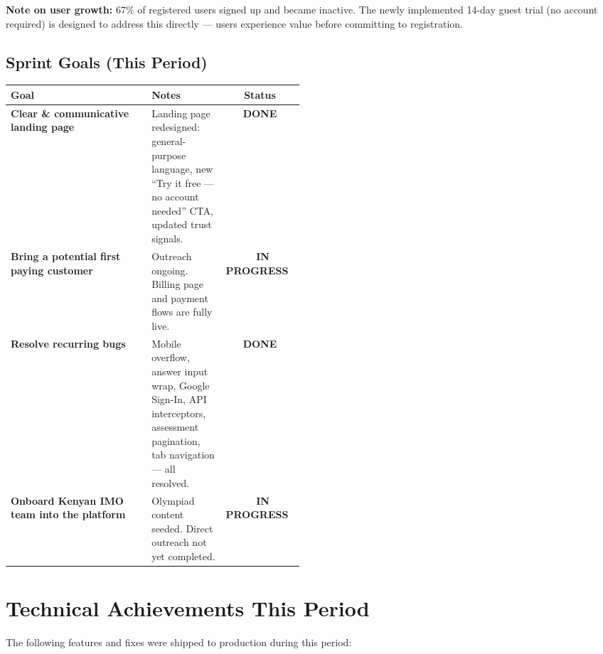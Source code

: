 \documentclass[12pt,a4paper]{article}
\newcommand{\badge}[2]{%
  \colorbox{#1}{\small\color{white}\textbf{\ #2\ }}%
}
\newcommand{\done}{\badge{emerald}{DONE}}
\newcommand{\inprog}{\badge{amber}{IN PROGRESS}}
\begin{document}
\vspace{6pt}
\textbf{Note on user growth:} 67\% of registered users signed up and became inactive.
The newly implemented 14-day guest trial (no account required) is designed to
address this directly — users experience value before committing to registration.

\subsection{Sprint Goals (This Period)}

\begin{tabularx}{\linewidth}{>{\bfseries}p{0.48\linewidth} X c}
\toprule
\textbf{Goal} & \textbf{Notes} & \textbf{Status} \\
\midrule
\rowcolor{rowgray}
Clear \& communicative landing page & Landing page redesigned: general-purpose
language, new ``Try it free — no account needed'' CTA, updated trust signals. & \done \\[4pt]
Bring a potential first paying customer & Outreach ongoing. Billing page and
payment flows are fully live. & \inprog \\[4pt]
\rowcolor{rowgray}
Resolve recurring bugs & Mobile overflow, answer input wrap, Google Sign-In,
API interceptors, assessment pagination, tab navigation — all resolved. & \done \\[4pt]
Onboard Kenyan IMO team into the platform & Olympiad content seeded.
Direct outreach not yet completed. & \inprog \\
\bottomrule
\end{tabularx}

\section{Technical Achievements This Period}

The following features and fixes were shipped to production during this period:
\end{document}
